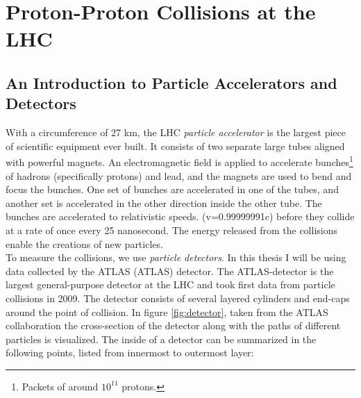 \section{Proton-Proton Collisions at the LHC}
\subsection{An Introduction to Particle Accelerators and Detectors}\label{subsec:Detector}
With a circumference of 27 km, the \ac{LHC} \emph{particle accelerator} is the largest piece of scientific 
equipment ever built. It consists of two separate large tubes aligned with powerful magnets. An electromagnetic field is
applied to accelerate bunches\footnote{Packets of around $10^{11}$ protons.} of hadrons (specifically protons) and lead,
and the magnets are used to bend and focus the bunches. One set of bunches are accelerated in one of the tubes, 
and another set is accelerated in the other direction inside the other tube. The bunches are accelerated to relativistic speeds.
(v=0.99999991c) before they collide at a rate of once every 25 nanosecond. The energy released from 
the collisions enable the creations of new particles.
\\
To measure the collisions, we use \emph{particle detectors}. In this thesis I will be using data collected by the 
\acs{ATLAS} (\acl{ATLAS}) detector. The \ac{ATLAS}-detector is the largest general-purpose detector at the \ac{LHC}
and took first data from particle collisions in 2009. The detector consists of several layered cylinders and end-caps 
around the point of collision. In figure \ref{fig:detector}, taken from the \ac{ATLAS} collaboration \cite{PDetector} the cross-section 
of the detector along with the paths of different particles is visualized. The inside of a detector can be summarized 
in the following points, listed from innermost to outermost layer:
